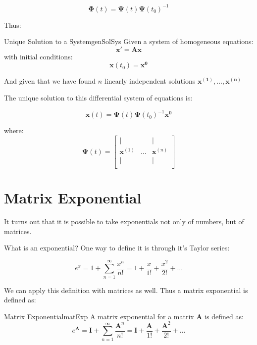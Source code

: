 \documentclass{report}
\begin{document}
$$\mathbf{\Phi}(t) = \mathbf{\Psi}(t)\mathbf{\Psi}(t_0)^{-1}$$

Thus:

\begin{mytheo}{Unique Solution to a System}{genSolSys}
    Given a system of homogeneous equations:
    $$\mathbf{x'} = \mathbf{Ax}$$
    with initial conditions:
    $$\mathbf{x}(t_0) = \mathbf{x^0}$$
    
    And given that we have found $n$ linearly independent solutions
    $\mathbf{x^{(1)}}, \dots, \mathbf{x^{(n)}}$  
    
    The unique solution to this differential system of equations is:
    
    $$\mathbf{x}(t) = \mathbf{\Psi}(t)\mathbf{\Psi}(t_0)^{-1}\mathbf{x^0}$$
    
    where:
    $$\mathbf{\Psi}(t)
    =
    \begin{bmatrix}
    \vert & & \vert \\
    \mathbf{x}^{(1)} & \dots & \mathbf{x}^{(n)} \\
    \vert & & \vert \\
    \end{bmatrix}
    $$
\end{mytheo}


\section{Matrix Exponential}
It turns out that it is possible to take exponentials not only of numbers, but of matrices.

What is an exponential? One way to define it is through it's Taylor series:

$$e^{x} = 1 + \sum_{n=1}^\infty \frac{x^n}{n!} = 1 + \frac{x}{1!} + \frac{x^2}{2!} + \dots$$

We can apply this definition with matrices as well. Thus a matrix exponential is defined as:

\begin{mytheo}{Matrix Exponential}{matExp}
    A matrix exponential for a matrix $\mathbf{A}$ is defined as:
    $$e^{\mathbf{A}} = \mathbf{I} + \sum_{n=1}^\infty \frac{\mathbf{A}^n}{n!} = \mathbf{I} + \frac{\mathbf{A}}{1!} + \frac{\mathbf{A}^2}{2!} + \dots$$
\end{mytheo}
\end{document}
